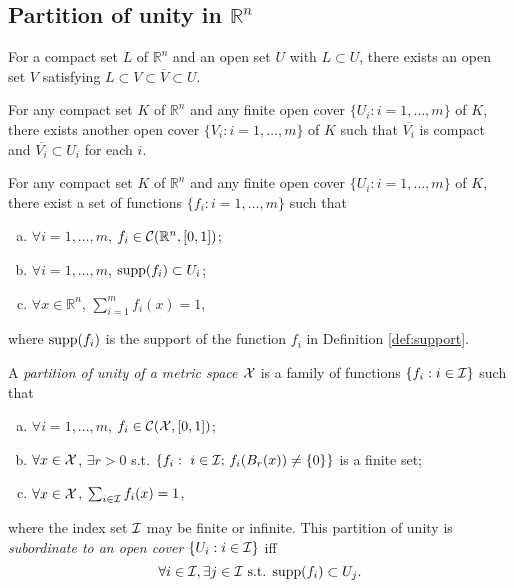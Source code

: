\subsection{Partition of unity in $\mathbb{R}^n$}
\label{sec:partition-unity}

\begin{lem}
  \label{lem:sandwichCompact}
  For a compact set $L$ of $\mathbb{R}^n$
  and an open set $U$ with $L\subset U$, 
  there exists an open set $V$ satisfying
  $L\subset V\subset \overline{V}\subset U$.
\end{lem}

\begin{lem}
  \label{lem:sandwichCompactSequence}
  For any compact set $K$ of $\mathbb{R}^n$
  and any finite open cover $\{U_i: i=1, \ldots, m\}$ of $K$, 
  there exists another open cover $\{V_i: i=1, \ldots, m\}$
  of $K$
  such that $\overline{V_i}$ is compact and
  $\overline{V_i}\subset U_i$ for each $i$.
\end{lem}

\begin{thm}
  \label{thm:openCoverForCompactSets}
  For any compact set $K$ of $\mathbb{R}^n$
  and any finite open cover $\{U_i: i=1, \ldots, m\}$ of $K$, 
  there exist a set of functions
  $\{f_i: %
  i=1, \ldots, m\}$
  such that
  \begin{enumerate}[(a)]\itemsep0em
  \item $\forall i=1, \ldots, m$,
    $f_i\in {\cal C}(\mathbb{R}^n, [0,1])$; 
  \item $\forall i=1, \ldots, m$,
    $\mathrm{supp}(f_i)\subset U_i$; 
  \item $\forall x\in \mathbb{R}^n$, $\sum_{i=1}^m f_i(x)=1$, 
  \end{enumerate}
  where $\mathrm{supp}(f_i)$ is the support of the function $f_i$
  in Definition \ref{def:support}.
\end{thm}


\begin{defn}
  \label{defn:partitionOfUnity}
  A \emph{partition of unity of a metric space ${\cal X}$}
  is a family of functions
  $\{f_i: i\in {\cal I}\}$ such that
  \begin{enumerate}[(a)]\itemsep0em
  \item $\forall i=1, \ldots, m$,
    $f_i\in {\cal C}({\cal X}, [0,1])$; 
  \item $\forall x\in {\cal X}$, 
    $\exists r>0$ s.t. 
    $\{f_i:\ i\in {\cal I};\, f_i(B_r(x))\ne \{0\}\}$
    is a finite set;
  \item $\forall x\in {\cal X}$, $\sum_{i\in{\cal I}} f_i(x)=1$, 
  \end{enumerate}
  where the index set ${\cal I}$ may be finite or infinite.
  This partition of unity is \emph{subordinate to an open cover}
  $\{U_i: i\in {\cal I}\}$ iff
  \begin{equation}
    \forall i\in{\cal I}, \exists j \in {\cal I} \text{ s.t. }
    \mathrm{supp}(f_i)\subset U_j. 
  \end{equation}
\end{defn}



